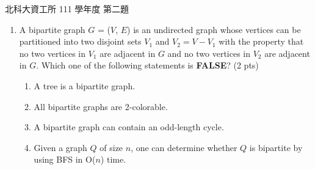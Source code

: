 \begin{pastexam}[label={px:ntut-111-ci-01}]{北科大資工所 111 學年度 第二題}
\begin{enumerate}[label=(\arabic*)]
\item A bipartite graph $G$ = ($V$, $E$) is an undirected graph whose vertices can be partitioned into two disjoint sets $V_1$ and $V_2 = V - V_1$ with the property that no two vertices in $V_1$ are adjacent in $G$ and no two vertices in $V_2$ are adjacent in $G$. Which one of the following statements is \textbf{FALSE}? (2 pts)
\begin{enumerate}[label=(\alph*),nosep]
\item A tree is a bipartite graph.
\item All bipartite graphs are 2-colorable.
\item A bipartite graph can contain an odd-length cycle.
\item Given a graph $Q$ of size $n$, one can determine whether $Q$ is bipartite by using BFS in O($n$) time.
\end{enumerate}
\end{enumerate}
\end{pastexam}

